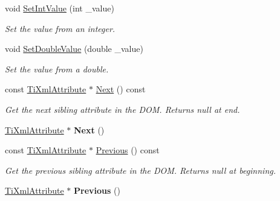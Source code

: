 \begin{DoxyCompactItemize}
void \hyperlink{classTiXmlAttribute_a7e065df640116a62ea4f4b7da5449cc8}{Set\+Int\+Value} (int \+\_\+value)
\begin{DoxyCompactList}\small\item\em Set the value from an integer. \end{DoxyCompactList}\item 
\mbox{\label{classTiXmlAttribute_a0316da31373496c4368ad549bf711394}} 
void \hyperlink{classTiXmlAttribute_a0316da31373496c4368ad549bf711394}{Set\+Double\+Value} (double \+\_\+value)
\begin{DoxyCompactList}\small\item\em Set the value from a double. \end{DoxyCompactList}\item 
\mbox{\label{classTiXmlAttribute_af2e78f1ba9ed56a26ddc80614ed1c393}} 
const \hyperlink{classTiXmlAttribute}{Ti\+Xml\+Attribute} $\ast$ \hyperlink{classTiXmlAttribute_af2e78f1ba9ed56a26ddc80614ed1c393}{Next} () const
\begin{DoxyCompactList}\small\item\em Get the next sibling attribute in the D\+OM. Returns null at end. \end{DoxyCompactList}\item 
\mbox{\label{classTiXmlAttribute_a138320aa7793b148ba7e5bd0a0ea4db6}} 
\hyperlink{classTiXmlAttribute}{Ti\+Xml\+Attribute} $\ast$ {\bfseries Next} ()
\item 
\mbox{\label{classTiXmlAttribute_afc7bbfdf83d59fbc4ff5e283d27b5d7d}} 
const \hyperlink{classTiXmlAttribute}{Ti\+Xml\+Attribute} $\ast$ \hyperlink{classTiXmlAttribute_afc7bbfdf83d59fbc4ff5e283d27b5d7d}{Previous} () const
\begin{DoxyCompactList}\small\item\em Get the previous sibling attribute in the D\+OM. Returns null at beginning. \end{DoxyCompactList}\item 
\mbox{\label{classTiXmlAttribute_ae4dabc932cba945ed1e92fec5f121193}} 
\hyperlink{classTiXmlAttribute}{Ti\+Xml\+Attribute} $\ast$ {\bfseries Previous} ()
\item 
\mbox{\label{classTiXmlAttribute_a51eef33c2cdd55831447af46be0baf8b}} 

\end{DoxyCompactItemize}
